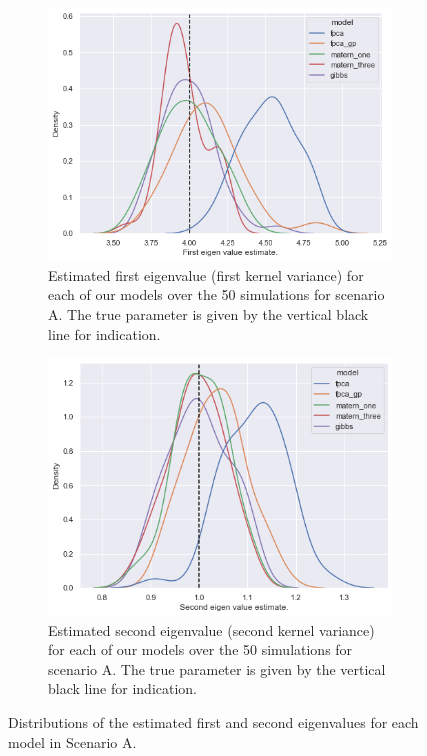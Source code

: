 \begin{figure}
	\centering
	\begin{subfigure}[b]{0.45\textwidth}
 		\includegraphics[width=\textwidth]{lambda_1_param_A}
 		\caption{Estimated first eigenvalue (first kernel variance) for each of our models over the 50 simulations for scenario A. The true parameter is given by the vertical black line for indication.}
 		\label{fig:lambda_1_param_A}
	\end{subfigure}
	\hfill
	\begin{subfigure}[b]{0.45\textwidth}
 		\includegraphics[width=\textwidth]{lambda_2_param_A}
 		\caption{Estimated second eigenvalue (second kernel variance) for each of our models over the 50 simulations for scenario A. The true parameter is given by the vertical black line for indication.}
 		\label{fig:lambda_2_param_A}
	\end{subfigure}
	\caption[Distributions of the estimated first and second eigenvalues for each model in Scenario A.]{Distributions of the estimated first and second eigenvalues for each model in Scenario A.}
	\label{fig:lambda_param_A}
\end{figure}

